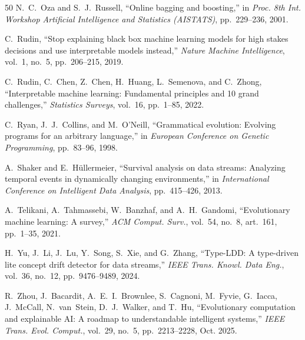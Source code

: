 \documentclass[lettersize,journal]{IEEEtran}
\begin{document}
\begin{thebibliography}{50}
N.~C.~Oza and S.~J.~Russell, ``Online bagging and boosting,'' in \textit{Proc. 8th Int. Workshop Artificial Intelligence and Statistics (AISTATS)}, pp.~229--236, 2001.

C.~Rudin, ``Stop explaining black box machine learning models for high stakes decisions and use interpretable models instead,'' \textit{Nature Machine Intelligence}, vol.~1, no.~5, pp.~206--215, 2019.

C.~Rudin, C.~Chen, Z.~Chen, H.~Huang, L.~Semenova, and C.~Zhong, ``Interpretable machine learning: Fundamental principles and 10 grand challenges,'' \textit{Statistics Surveys}, vol.~16, pp.~1--85, 2022.

C.~Ryan, J.~J.~Collins, and M.~O'Neill, ``Grammatical evolution: Evolving programs for an arbitrary language,'' in \textit{European Conference on Genetic Programming}, pp.~83--96, 1998.

A.~Shaker and E.~H\"{u}llermeier, ``Survival analysis on data streams: Analyzing temporal events in dynamically changing environments,'' in \textit{International Conference on Intelligent Data Analysis}, pp.~415--426, 2013.

A.~Telikani, A.~Tahmassebi, W.~Banzhaf, and A.~H.~Gandomi, ``Evolutionary machine learning: A survey,'' \textit{ACM Comput. Surv.}, vol.~54, no.~8, art.~161, pp.~1--35, 2021.

H.~Yu, J.~Li, J.~Lu, Y.~Song, S.~Xie, and G.~Zhang, ``Type-{LDD}: A type-driven lite concept drift detector for data streams,'' \textit{IEEE Trans. Knowl. Data Eng.}, vol.~36, no.~12, pp.~9476--9489, 2024.

R.~Zhou, J.~Bacardit, A.~E.~I.~Brownlee, S.~Cagnoni, M.~Fyvie, G.~Iacca, J.~McCall, N.~van~Stein, D.~J.~Walker, and T.~Hu, ``Evolutionary computation and explainable {AI}: A roadmap to understandable intelligent systems,'' \textit{IEEE Trans. Evol. Comput.}, vol.~29, no.~5, pp.~2213--2228, Oct. 2025.

\end{thebibliography}
\end{document}
